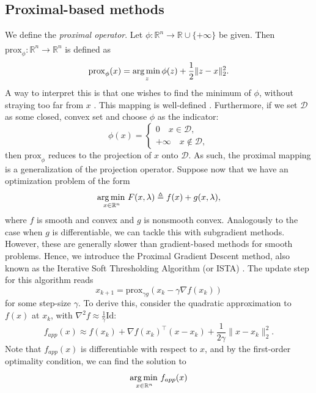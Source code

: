 \documentclass[11pt, twoside]{report}
\begin{document}
\subsection{Proximal-based methods}
We define the \textit{proximal operator}. Let $\phi : \mathbb{R}^n \xrightarrow[]{} \mathbb{R} \cup \{+\infty\}$ be given. Then $\mathrm{prox}_\phi: \mathbb{R}^n \xrightarrow[]{} \mathbb{R}^n$ is defined as
\begin{equation} \label{proximal}
    \mathrm{prox}_{\phi}(x) =\underset{z} {\operatorname*{arg\, min \,}} \phi(z) + \frac{1}{2}\|z-x\|_2^2.
\end{equation}
A way to interpret this is that one wishes to find the minimum of $\phi$, without straying too far from $x$ \cite{proxalgs}. This mapping is well-defined \cite{fawzi2022lectures}. Furthermore, if we set $\mathcal{D}$ as some closed, convex set and choose $\phi$ as the indicator:
\[\phi(x) = \begin{cases}
  0 \quad x \in \mathcal{D}, \\
  +\infty \quad x \notin \mathcal{D},
\end{cases}\]
then $\mathrm{prox}_\phi$ reduces to the projection of $x$ onto $\mathcal{D}$. As such, the proximal mapping is a generalization of the projection operator. Suppose now that we have an optimization problem of the form
\begin{equation}
    \operatorname*{arg\, min \,}_{x \in \mathbb{R}^n} {F(x, \lambda) \triangleq f(x) + g(x,\lambda)},
\end{equation}
where $f$ is smooth and convex and $g$ is nonsmooth convex. Analogously to the case when $g$ is differentiable, we can tackle this with subgradient methods. However, these are generally slower than gradient-based methods for smooth problems. Hence, we introduce the Proximal Gradient Descent method, also known as the Iterative Soft Thresholding Algorithm (or ISTA) \cite{daubechies2004iterative}. The update step for this algorithm reads
\begin{equation} \label{ISTA_step}
    x_{k+1} = \mathrm{prox}_{\gamma g}(x_k - \gamma \nabla f(x_k))
\end{equation}
for some step-size $\gamma$. To derive this, consider the quadratic approximation to $f(x)$ at $x_k$, with $\nabla^2 f \approx \frac{1}{\gamma}\mathrm{Id}$:
\[f_{app}(x) \approx f(x_k) + \nabla f(x_k)^\top (x-x_k) + \frac{1}{2\gamma} \|x-x_k\|_2^2.\]
Note that $f_{app}(x)$ is differentiable with respect to $x$, and by the first-order optimality condition, we can find the solution to 
\[\operatorname*{arg\, min \,}_{x \in \mathbb{R}^n} f_{app}(x)\]
\end{document}
